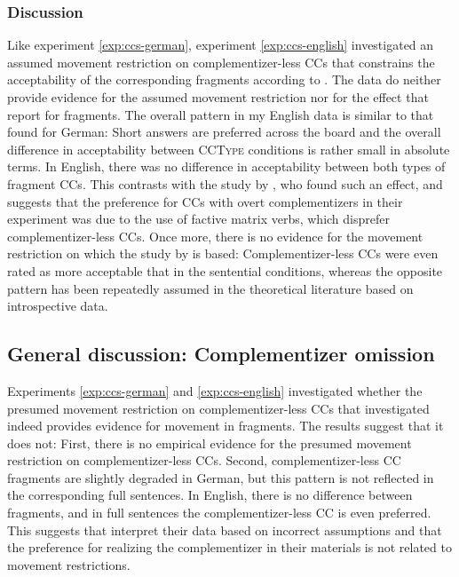 \subsubsection{Discussion}
Like experiment \ref{exp:ccs-german}, experiment \ref{exp:ccs-english} investigated an assumed movement restriction on complementizer-less CCs that constrains the acceptability of the corresponding fragments according to \citet{merchant.etal2013}. The data do neither provide evidence for the assumed movement restriction nor for the effect that \citet{merchant.etal2013} report for fragments. The overall pattern in my English data is similar to that found for German: Short answers are preferred across the board and the overall difference in acceptability between \textsc{CCType} conditions is rather small in absolute terms. In English, there was no difference in acceptability between both types of fragment CCs. This contrasts with the study by \citet{merchant.etal2013}, who found such an effect, and suggests that the preference for CCs with overt complementizers in their experiment was due to the use of factive matrix verbs, which disprefer complementizer-less CCs. Once more, there is no evidence for the movement restriction on which the study by \citet{merchant.etal2013} is based: Complementizer-less CCs were even rated as more acceptable that in the sentential conditions, whereas the opposite pattern has been repeatedly assumed in the theoretical literature based on introspective data.

\subsection{General discussion: Complementizer omission}
Experiments \ref{exp:ccs-german} and \ref{exp:ccs-english} investigated whether the presumed movement restriction on comple\-men\-tizer-less CCs that \citet{merchant.etal2013} investigated indeed provides evidence for movement in fragments. The results suggest that it does not: First, there is no empirical evidence for the presumed movement restriction on complementizer-less CCs. Second, complementizer-less CC fragments are slightly degraded in German, but this pattern is not reflected in the corresponding full sentences. In English, there is no difference between fragments, and in full sentences the complementizer-less CC is even preferred. This suggests that \citet{merchant.etal2013} interpret their data based on incorrect assumptions and that the preference for realizing the complementizer in their materials is not related to movement restrictions.

